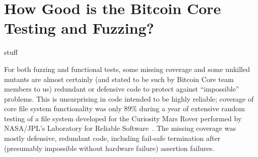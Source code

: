 \section{How Good is the Bitcoin Core Testing and Fuzzing?}


stuff

For both fuzzing and functional tests, some missing coverage and some
unkilled mutants are almost
certainly (and stated to be such by Bitcoin Core team members to us)
redundant or defensive code to protect against ``impossible''
problems.  This is unsurprising in code intended to be highly reliable;
coverage of core file system functionality was only 89\% during a year of
extensive random testing of a file system developed for the Curiosity
Mars Rover performed by NASA/JPL's Laboratory for Reliable
Software~\cite{ICSEDiff}.  The missing coverage was mostly defensive,
redundant code, including fail-safe termination after (presumably
impossible without hardware failure)
assertion failures.